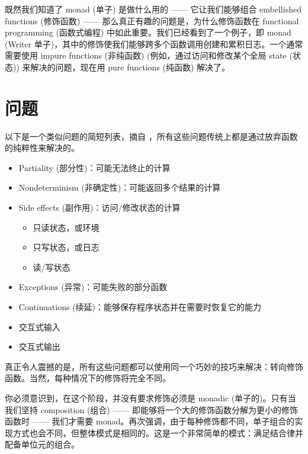 
\lettrine[lhang=0.17]{既}{然我们知道了} monad (单子) 是做什么用的 —— 它让我们能够组合 embellished functions (修饰函数) —— 那么真正有趣的问题是，为什么修饰函数在 functional programming (函数式编程) 中如此重要。我们已经看到了一个例子，即  monad (Writer 单子)，其中的修饰使我们能够跨多个函数调用创建和累积日志。一个通常需要使用 impure functions (非纯函数) (例如，通过访问和修改某个全局 state (状态)) 来解决的问题，现在用 pure functions (纯函数) 解决了。

\section{问题}

以下是一个类似问题的简短列表，摘自 ，所有这些问题传统上都是通过放弃函数的纯粹性来解决的。

\begin{itemize}
  \tightlist
  \item
        Partiality (部分性)：可能无法终止的计算
  \item
        Nondeterminism (非确定性)：可能返回多个结果的计算
  \item
        Side effects (副作用)：访问/修改状态的计算

        \begin{itemize}
          \tightlist
          \item
                只读状态，或环境
          \item
                只写状态，或日志
          \item
                读/写状态
        \end{itemize}
  \item
        Exceptions (异常)：可能失败的部分函数
  \item
        Continuations (续延)：能够保存程序状态并在需要时恢复它的能力
  \item
        交互式输入
  \item
        交互式输出
\end{itemize}

真正令人震撼的是，所有这些问题都可以使用同一个巧妙的技巧来解决：转向修饰函数。当然，每种情况下的修饰将完全不同。

你必须意识到，在这个阶段，并没有要求修饰必须是 monadic (单子的)。只有当我们坚持 composition (组合) —— 即能够将一个大的修饰函数分解为更小的修饰函数时 —— 我们才需要 monad。再次强调，由于每种修饰都不同，单子组合的实现方式也会不同，但整体模式是相同的。这是一个非常简单的模式：满足结合律并配备单位元的组合。

